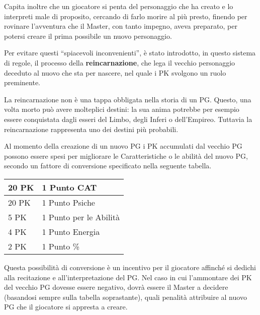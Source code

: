 Capita inoltre che un giocatore si penta del personaggio che ha creato
e lo interpreti male di proposito, cercando di farlo morire al pi\`u
presto, finendo per rovinare l'avventura che il Master, con tanto
impegno, aveva preparato, per potersi creare il prima possibile un
nuovo personaggio.

Per evitare questi ``spiacevoli inconvenienti'', \`e stato
introdotto, in questo sistema di regole, il processo della
\textbf{reincarnazione}, che lega il vecchio personaggio deceduto al
nuovo che sta per nascere, nel quale i PK svolgono un ruolo
preminente.  

La reincarnazione non \`e una tappa obbligata nella storia di un PG.
Questo, una volta morto pu\`o avere molteplici destini: la sua anima
potrebbe per esempio essere conquistata dagli esseri del Limbo, degli
Inferi o dell'Empireo.  Tuttavia la reincarnazione rappresenta uno dei
destini pi\`u probabili.

Al momento della creazione di un nuovo PG i PK accumulati dal vecchio
PG possono essere spesi per migliorare le Caratteristiche o le
abilit\`a del nuovo PG, secondo un fattore di conversione specificato
nella seguente tabella.

\begin{center}
\begin{tabular}{|l|l|}
\hline
20 PK & 1 Punto CAT \\ \hline
20 PK & 1 Punto Psiche \\ \hline
5 PK & 1 Punto per le Abilit\`a \\ \hline
4 PK & 1 Punto Energia \\ \hline
2 PK & 1 Punto \% \\ \hline
\end{tabular}
\end{center}

Questa possibilit\`a di conversione \`e un incentivo per il giocatore
affinch\'e si dedichi alla recitazione e all'interpretazione del PG.
Nel caso in cui l'ammontare dei PK del vecchio PG dovesse essere
negativo, dovr\`a essere il Master a decidere (basandosi sempre sulla
tabella soprastante), quali penalit\`a attribuire al nuovo PG che il
giocatore si appresta a creare.


